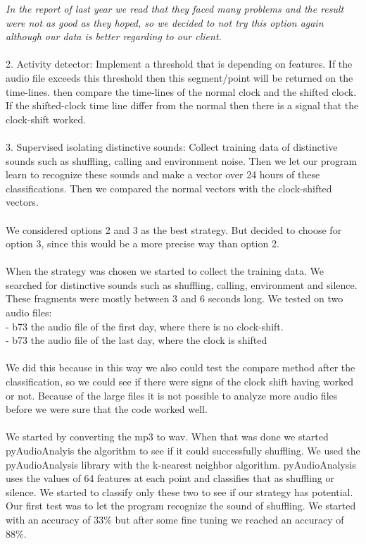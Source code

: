 \documentclass[a4paper]{article}
\begin{document}
\emph{In the report of last year we read that they faced many problems and the result were not as good as they hoped, so we decided to not try this option again although our data is better regarding to our client.}\\\\
2. Activity detector: Implement a threshold that is depending on features. If the audio file exceeds this threshold then this segment/point will be returned on the time-lines. then compare the time-lines of the normal clock and the shifted clock. If the shifted-clock time line differ from the normal then there is a signal that the clock-shift worked.\\\\
3. Supervised isolating distinctive sounds: Collect training data of distinctive sounds such as shuffling, calling and environment noise. Then we let our program learn to recognize these sounds and make a vector over 24 hours of these classifications. Then we compared the normal vectors with the clock-shifted vectors. \\\\
We considered options 2 and 3 as the best strategy. But decided to choose for option 3, since this would be a more precise way than option 2. \\\\
When the strategy was chosen we started to collect the training data. We searched for distinctive sounds such as shuffling, calling, environment and silence. These fragments were mostly between 3 and  6 seconds long. We tested on two audio files:\\
- b73 the audio file of the first day, where there is no clock-shift. \\
- b73 the audio file of the last day, where the clock is shifted\\\\
We did this because in this way we also could test the compare method after the classification, so we could see if there were signs of the clock shift having worked or not. Because of the large files it is not possible to analyze more audio files before we were sure that the code worked well.\\\\
We started by converting the mp3 to wav. When that was done we started pyAudioAnalyis the algorithm to see if it could successfully shuffling. We used the pyAudioAnalysis library with the k-nearest neighbor algorithm. pyAudioAnalysis uses the values of 64 features at each point and classifies that as shuffling or silence. We started to classify only these two to see if our strategy has potential.  Our first test was to let the program recognize the sound of shuffling. We started with an accuracy of 33\% but after some fine tuning we reached an accuracy of 88\%.\\\\
\end{document}
